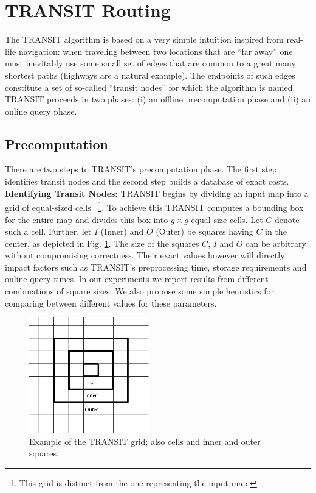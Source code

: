 \section{TRANSIT Routing}
\label{sec:transit}
The TRANSIT algorithm is based on a very simple intuition inspired from real-life navigation: when traveling
between two locations that are ``far away'' one must inevitably use some small set of edges that
are common to a great many shortest paths (highways are a natural example).
The endpoints of such edges constitute a set of so-called ``transit nodes'' for which the algorithm is named.
TRANSIT proceeds in two phases: (i) an offline precomputation phase and (ii) an online query phase.

\subsection {Precomputation}
\label{sub:precomputation}
There are two steps to TRANSIT's precomputation phase. The first step identifies transit nodes and 
the second step builds a database of exact costs. 
\newline
\textbf{Identifying Transit Nodes: } TRANSIT begins by dividing an input map into a grid of equal-sized cells~
\footnote{ This grid is distinct from the one representing the input map.}. 
To achieve this TRANSIT computes a bounding box for the entire map and divides this box
into $g \times g$ equal-size cells.  
Let $C$ denote such a cell. Further, let $I$ (Inner) and $O$ (Outer) 
be squares having $C$ in the center, as depicted in Fig. \ref{fig:example}.
The size of the squares $C$, $I$ and $O$ can be arbitrary without compromising correctness. Their exact
values however will directly impact factors such as TRANSIT's preprocessing time, storage requirements and 
online query times.
In our experiments we report results from different combinations of square sizes. We also propose some simple
heuristics for comparing between different values for these parameters.

\begin{figure}[tb]
\centering
\includegraphics[height=5cm]{diagrams/transit_example3.PNG}
\caption{Example of the TRANSIT grid; also cells and inner and outer squares. }
\label{fig:example}
\end{figure}

